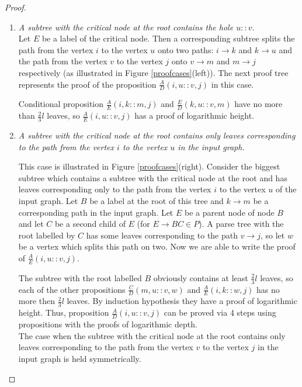 \begin{proof}
\begin{enumerate}
\item \textit{A subtree with the critical node at the root contains the hole $u :: v$.} 
\\ Let $E$ be a label of the critical node. Then a corresponding subtree splits the path from the vertex $i$ to the vertex $u$ onto two paths: $i \rightarrow k$ and $k \rightarrow u$ and the path from the vertex $v$ to the vertex $j$ onto $v \rightarrow m$ and $m \rightarrow j$ respectively (as illustrated in Figure \ref{proofcases}(left)). The next proof tree represents the proof of the proposition $\frac{A}{D}(i , u ::v, j)$ in this case. 
\begin{prooftree}
\end{prooftree}
Conditional proposition $\frac{A}{E}(i , k :: m , j)$ and $\frac{E}{D}(k , u :: v , m)$ have no more than $\frac{2}{3}l$ leaves, so $\frac{A}{E}(i , u :: v , j)$ has a proof of logarithmic height.

\item \textit{A subtree with the critical node at the root contains only leaves corresponding to the path from the vertex $i$ to the vertex $u$ in the input graph.}


This case is illustrated in Figure \ref{proofcases}(right). Consider the biggest subtree which contains a subtree with the critical node at the root and has leaves corresponding only to the path from the vertex $i$ to the vertex $u$ of the input graph. Let $B$ be a label at the root of this tree and $k \rightarrow m$  be a corresponding path in the input graph. Let $E$ be a parent node of node $B$ and let $C$ be a second child of $E$ (for $E \rightarrow BC \in P$). A parse tree with the root labelled by $C$ has some leaves corresponding to the path $v \rightarrow j$, so let $w$ be a vertex which splits this path on two. Now we are able to write the proof of $\frac{A}{E}(i , u :: v , j)$.
\begin{prooftree}
\end{prooftree}
The subtree with the root labelled $B$ obviously contains at least $\frac{2}{3}l$ leaves, so each of the other propositions $\frac{C}{D}(m , u :: v , w)$ and $\frac{A}{E}(i , k :: w , j)$ has no more then  $\frac{2}{3}l$ leaves. By induction hypothesis they have a proof of logarithmic height. Thus, proposition  $\frac{A}{D}(i , u :: v , j)$ can be proved via 4 steps using propositions with the proofs of logarithmic depth.
\\The case when the subtree with the critical node at the root contains only leaves corresponding to the path from the vertex $v$ to the vertex $j$ in the input graph is held symmetrically.
\end{enumerate}
\end{proof}
